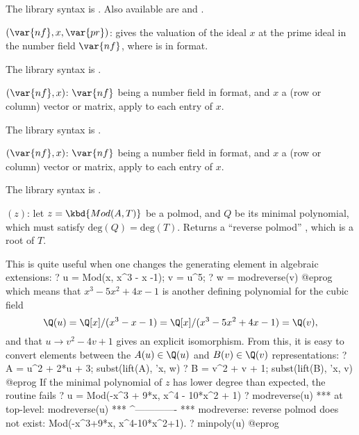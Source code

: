 The library syntax is .
Also available are
 and
.

$(\var{nf},x,\var{pr})$: \label{se:idealval}gives the valuation of the ideal $x$ at the prime ideal  in the
number field $\var{nf}$, where  is in  format.

The library syntax is .

$(\var{nf},x)$: \label{se:matalgtobasis}$\var{nf}$ being a number field in  format, and $x$ a
(row or column) vector or matrix, apply  to each entry
of $x$.

The library syntax is .

$(\var{nf},x)$: \label{se:matbasistoalg}$\var{nf}$ being a number field in  format, and $x$ a
(row or column) vector or matrix, apply  to each entry
of $x$.

The library syntax is .

$(z)$: \label{se:modreverse}let $z = \kbd{Mod(A, T)}$ be a polmod, and $Q$ be its minimal
polynomial, which must satisfy $\text{deg}(Q) = \text{deg}(T)$.
Returns a ``reverse polmod'' , which is a root of $T$.

This is quite useful when one changes the generating element in algebraic
extensions:
\bprog
? u = Mod(x, x^3 - x -1); v = u^5;
? w = modreverse(v)
@eprog\noindent
which means that $x^3 - 5x^2 + 4x -1$ is another defining polynomial for the
cubic field
$$\Q(u) = \Q[x]/(x^3 - x - 1) = \Q[x]/(x^3 - 5x^2 + 4x - 1) = \Q(v),$$
and that $u \to v^2 - 4v + 1$ gives an explicit isomorphism. From this, it is
easy to convert elements between the $A(u)\in \Q(u)$ and $B(v)\in \Q(v)$
representations:
\bprog
? A = u^2 + 2*u + 3; subst(lift(A), 'x, w)
? B = v^2 + v + 1;   subst(lift(B), 'x, v)
@eprog
If the minimal polynomial of $z$ has lower degree than expected, the routine
fails
\bprog
? u = Mod(-x^3 + 9*x, x^4 - 10*x^2 + 1)
? modreverse(u)
  ***   at top-level: modreverse(u)
  ***                 ^-------------
  *** modreverse: reverse polmod does not exist: Mod(-x^3+9*x, x^4-10*x^2+1).
? minpoly(u)
@eprog


